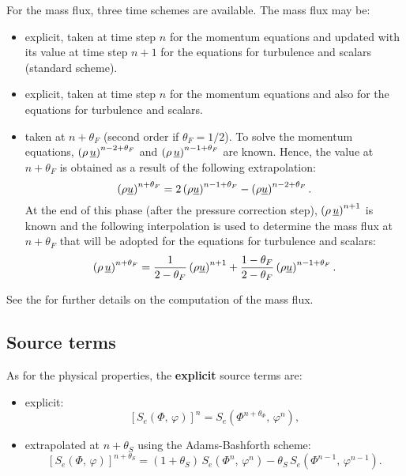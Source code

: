 For the mass flux, three time schemes are available. The mass flux may be:
%
\begin{itemize}
\item explicit, taken at time step $n$ for the momentum equations and
updated with its value at time step $n+1$ for the equations for turbulence
and scalars (standard scheme).

\item explicit, taken at time step $n$ for the momentum equations and
also for the equations for turbulence and scalars.

\item taken at $n+\theta_{F}$ (second order if $\theta_{F}=1/2$). To
solve the momentum equations, $\left(\rho\,\underline{u}\right)^{n-2+\theta_{F}}$ and
$\left(\rho\,\underline{u}\right)^{n-1+\theta_{F}}$ are known. Hence, the value at
$n+\theta_{F}$ is obtained as a result of the following extrapolation:
\begin{equation}
\left(\rho\underline{u}\right)^{n+\theta_{F}}
= 2 \left(\rho \underline{u}\right)^{n-1+\theta_{F}}
- \left(\rho \underline{u}\right)^{n-2+\theta_{F}}.
\end{equation}
At the end of this phase (after the pressure correction step),
$\left(\rho\,\underline{u}\right)^{n+1}$ is known and the following interpolation is used to
determine the mass flux at $n+\theta_{F}$ that will be adopted for the
equations for turbulence and scalars:
\begin{equation}
\left(\rho\,\underline{u}\right)^{n+\theta_{F}}= \dfrac{1}{2-\theta_{F}}
   \left(\rho \underline{u}\right)^{n+1}
+\frac{1-\theta_{F}}{2-\theta_{F}} \left(\rho \underline{u}\right)^{n-1+\theta_{F}}.
\end{equation}
\end{itemize}

See the  for further details
on the computation of the mass flux.

\subsection{Source terms}

As for the physical properties, the \textbf{explicit} source terms are:

\begin{itemize}
\item explicit:
\begin{equation}
\left[ S_{e} \left(\Phi , \, \varphi \right) \right]^{n}=S_{e}\left(\Phi ^{n+\theta_{\Phi }}, \, \varphi^{n} \right),
\end{equation}

\item extrapolated at $n+\theta _{S}$ using the Adams-Bashforth scheme:
\begin{equation}
\left[ S_{e} \left(\Phi , \, \varphi \right) \right]^{n+\theta _{S}}=\left(1+\theta _{S}\right)\,
S_{e}\left(\Phi^{n}, \, \varphi^{n}\right)-\theta _{S}\,S_{e} \left(\Phi ^{n-1} , \,\varphi ^{n-1}\right) .
\end{equation}
\end{itemize}

